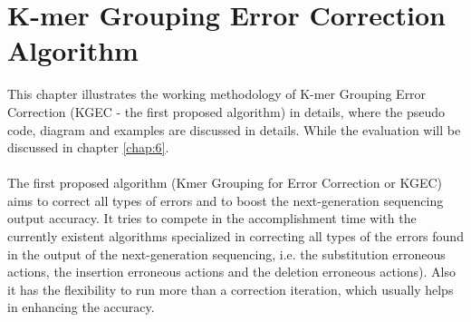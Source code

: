 \documentclass[12pt,openany]{llncs}
\begin{document}
\newpage
\chapter{\label{chap:4}K-mer Grouping Error Correction Algorithm}
This chapter illustrates the working methodology of K-mer Grouping Error Correction (KGEC - the first proposed algorithm) in details, where the pseudo code, diagram and examples are discussed in details. While the evaluation will be discussed in chapter \ref{chap:6}.
\\
\\
The first proposed algorithm (Kmer Grouping for Error Correction or KGEC) aims to correct all types of errors and to boost the next-generation sequencing output accuracy. It tries to compete in the accomplishment time with the currently existent algorithms specialized in correcting all types of the errors found in the output of the next-generation sequencing, i.e. the substitution erroneous actions, the insertion erroneous actions and the deletion erroneous actions). Also it has the flexibility to run more than a correction iteration, which usually helps in enhancing the accuracy.
\end{document}
